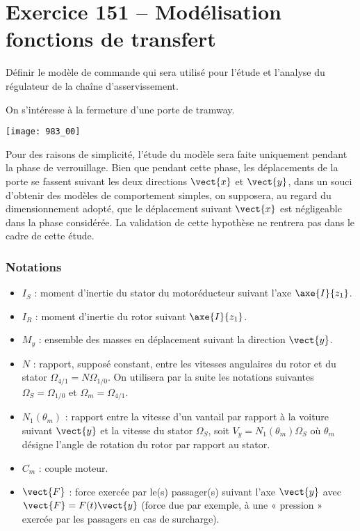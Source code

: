 \section*{Exercice 151 -- Modélisation fonctions de transfert}
\setcounter{exo}{0}


\begin{obj}
Définir le modèle de commande qui sera utilisé pour l’étude et l’analyse
du régulateur de la chaîne d’asservissement.
\end{obj}

On s'intéresse à la fermeture d'une porte de tramway.

\begin{center}
\texttt{[image: 983\_00]}%
\end{center}


Pour des raisons de simplicité, l’étude du modèle sera faite uniquement pendant
la phase de verrouillage. Bien que pendant cette phase, les déplacements de la
porte se fassent suivant les deux directions $\vect{x}$ et $\vect{y}$, dans un souci d’obtenir des
modèles de comportement simples, on supposera, au regard du dimensionnement
adopté, que le déplacement suivant $\vect{x}$ est négligeable dans la phase considérée.
La validation de cette hypothèse ne rentrera pas dans le cadre de cette
étude.


\subsubsection*{Notations}
\begin{itemize}
\item $I_S$ : moment d’inertie du stator du motoréducteur suivant l’axe $\axe{I}{z_1}$.
\item $I_R$ : moment d’inertie du rotor suivant $\axe{I}{z_1}$.
\item $M_y$ : ensemble des masses en déplacement suivant la direction $\vect{y}$.
\item $N$ : rapport, supposé constant, entre les vitesses angulaires du rotor et du stator $\Omega_{4/1}=N\Omega_{1/0}$. On utilisera par la suite les notations suivantes $\Omega_S=\Omega_{1/0}$ et $\Omega_m = \Omega_{4/1}$.
\item $N_1\left(\theta_m\right)$ : rapport entre la vitesse d’un vantail par rapport à la voiture suivant $\vect{y}$ et la vitesse du stator $\Omega_S$, soit $V_y=N_1\left(\theta_m\right)\Omega_S$ où $\theta_m$ désigne l’angle de rotation
du rotor par rapport au stator.
\item $C_m$ : couple moteur.
\item $\vect{F}$ : force exercée par le(s) passager(s) suivant l’axe $\vect{y}$ avec $\vect{F}=F(t)\vect{y} $  (force due
par exemple, à une « pression » exercée par les passagers en cas de surcharge).
\end{itemize}

